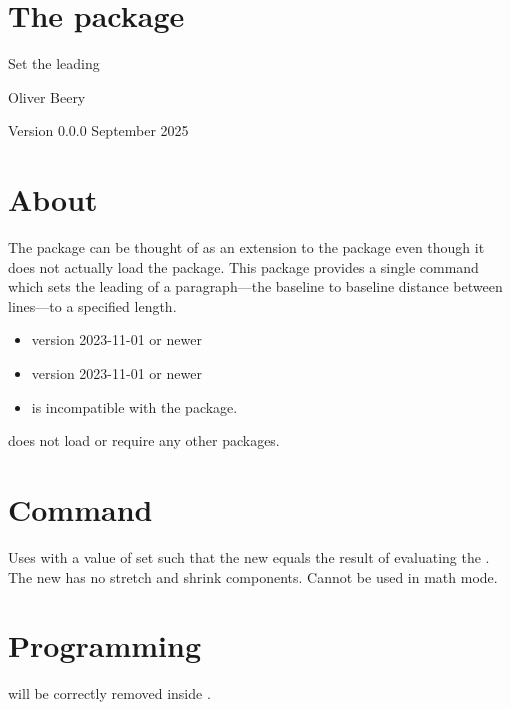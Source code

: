 \documentclass{beery}
\begin{document}
\section*{The  package}

Set the leading

Oliver Beery

Version 0.0.0 September 2025


\section{About}
\label{sec:about}

The  package can be thought of as an extension to the  package even though it does not actually load the  package.
This package provides a single command  which sets the leading of a paragraph---the baseline to baseline distance between lines---to a specified length.

\begin{itemize}
  \item \LaTeXe{} version 2023-11-01 or newer
  \item {} version 2023-11-01 or newer
  \item {} is incompatible with the  package.
\end{itemize}

 does not load or require any other packages.


\section{Command}
\label{sec:command}

\begin{function}{\leading}
  \begin{syntax}
     
  \end{syntax}
  Uses  with a value of  set such that the new  equals the result of evaluating the .
  The new  has no stretch and shrink components.
  Cannot be used in math mode.
\end{function}


\section{Programming}
\label{sec:programming}

 will be correctly removed inside .
\end{document}
